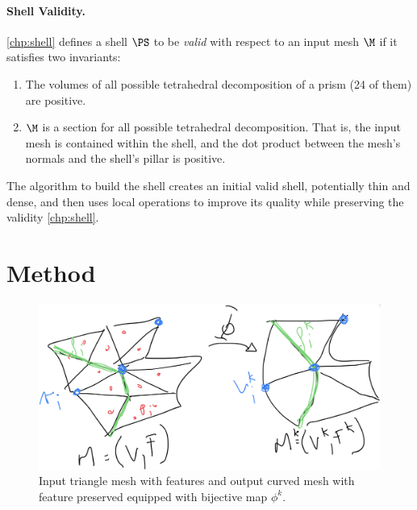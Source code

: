 \paragraph{Shell Validity.}
\ref{chp:shell} defines a shell $\PS$ to be \emph{valid} with respect to an input mesh $\M$ if it satisfies two invariants:
\begin{enumerate}
    \item The volumes of all possible tetrahedral decomposition of a prism (24 of them) are positive.
    \item $\M$ is a section for all possible tetrahedral decomposition. That is, the input mesh is contained within the shell, and the dot product between the mesh's normals and the shell's pillar is positive. 
\end{enumerate}


The algorithm to build the shell creates an initial valid shell, potentially thin and dense, and then uses local operations to improve its quality while preserving the validity \ref{chp:shell}.


\section{Method}

\begin{figure}
    \centering
    \includegraphics[width=\linewidth]{curve_meshing_in_shell_tex/figs/input-output}
    \caption{Input triangle mesh with features and output curved mesh with feature preserved equipped with bijective map $\phi^k$.}
    \label{bichon:fig:input-output}
\end{figure}

